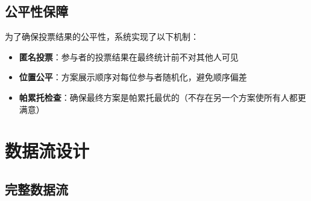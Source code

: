 \documentclass[12pt,a4paper]{ctexart}
\begin{document}
\subsection{公平性保障}

为了确保投票结果的公平性，系统实现了以下机制：

\begin{itemize}[leftmargin=2em]
  \item \textbf{匿名投票}：参与者的投票结果在最终统计前不对其他人可见
  \item \textbf{位置公平}：方案展示顺序对每位参与者随机化，避免顺序偏差
  \item \textbf{帕累托检查}：确保最终方案是帕累托最优的（不存在另一个方案使所有人都更满意）
\end{itemize}

\newpage

\section{数据流设计}

\subsection{完整数据流}
\end{document}
